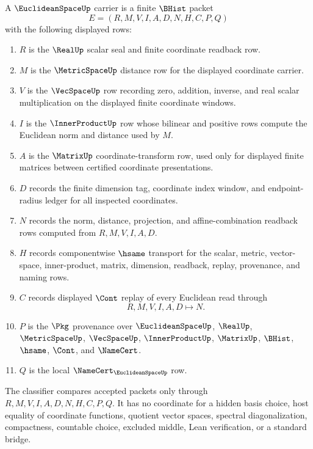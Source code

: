 \begin{definition}
\label{def:euclidean-space-carrier}
A $\EuclideanSpaceUp$ carrier is a finite $\BHist$ packet
$$
E=(R,M,V,I,A,D,N,H,C,P,Q)
$$
with the following displayed rows:
\begin{enumerate}
\item $R$ is the $\RealUp$ scalar seal and finite coordinate readback row.
\item $M$ is the $\MetricSpaceUp$ distance row for the displayed coordinate carrier.
\item $V$ is the $\VecSpaceUp$ row recording zero, addition, inverse, and real scalar multiplication on the displayed finite coordinate windows.
\item $I$ is the $\InnerProductUp$ row whose bilinear and positive rows compute the Euclidean norm and distance used by $M$.
\item $A$ is the $\MatrixUp$ coordinate-transform row, used only for displayed finite matrices between certified coordinate presentations.
\item $D$ records the finite dimension tag, coordinate index window, and endpoint-radius ledger for all inspected coordinates.
\item $N$ records the norm, distance, projection, and affine-combination readback rows computed from $R,M,V,I,A,D$.
\item $H$ records componentwise $\hsame$ transport for the scalar, metric, vector-space, inner-product, matrix, dimension, readback, replay, provenance, and naming rows.
\item $C$ records displayed $\Cont$ replay of every Euclidean read through
$$
R,M,V,I,A,D \longmapsto N .
$$
\item $P$ is the $\Pkg$ provenance over $\EuclideanSpaceUp$, $\RealUp$, $\MetricSpaceUp$, $\VecSpaceUp$, $\InnerProductUp$, $\MatrixUp$, $\BHist$, $\hsame$, $\Cont$, and $\NameCert$.
\item $Q$ is the local $\NameCert_{\EuclideanSpaceUp}$ row.
\end{enumerate}
The classifier compares accepted packets only through $R,M,V,I,A,D,N,H,C,P,Q$. It has no coordinate for a hidden basis choice, host equality of coordinate functions, quotient vector spaces, spectral diagonalization, compactness, countable choice, excluded middle, Lean verification, or a standard bridge.
\end{definition}

